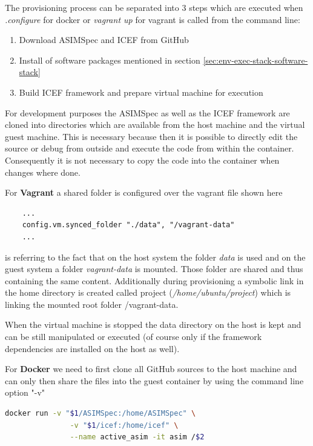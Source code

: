 The provisioning process can be separated into 3 steps which are executed when \textit{.\/configure} for docker or \textit{vagrant up} for vagrant is called from the command line:

\begin{enumerate}
	\item Download ASIMSpec and ICEF from GitHub
	\item Install of software packages mentioned in section \ref{sec:env-exec-stack-software-stack}
	\item Build ICEF framework and prepare virtual machine for execution
\end{enumerate}

For development purposes the ASIMSpec as well as the ICEF framework are cloned into directories which are available from the host machine and the virtual guest machine. This is necessary because then it is possible to directly edit the source or debug from outside and execute the code from within the container. Consequently it is not necessary to copy the code into the container when changes where done.

For \textbf{Vagrant} a shared folder is configured over the vagrant file shown here

\begin{lstlisting}
	...
	config.vm.synced_folder "./data", "/vagrant-data"
	...
\end{lstlisting}

is referring to the fact that on the host system the folder \textit{data} is used and on the guest system a folder \textit{vagrant-data} is mounted. Those folder are shared and thus containing the same content. Additionally during provisioning a symbolic link in the home directory is created called project (\textit{/home/ubuntu/project}) which is linking the mounted root folder /vagrant-data.

When the virtual machine is stopped the data directory on the host is kept and can be still manipulated or executed (of course only if the framework dependencies are installed on the host as well).

For \textbf{Docker} we need to first clone all GitHub sources to the host machine and can only then share the files into the guest container by using the command line option "-v"

\begin{lstlisting}[language=bash]
	docker run -v "$1/ASIMSpec:/home/ASIMSpec" \
	           -v "$1/icef:/home/icef" \
	           --name active_asim -it asim /$2
\end{lstlisting}

